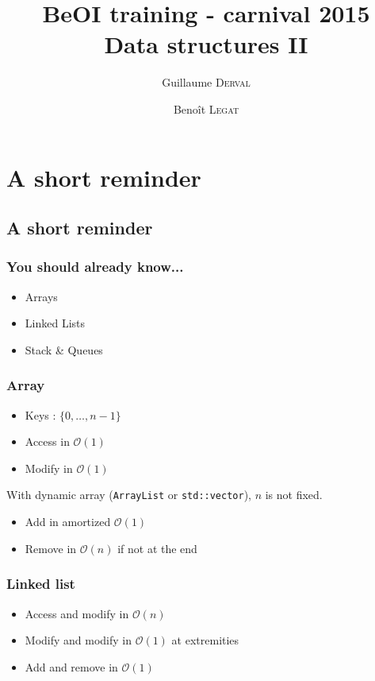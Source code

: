 \documentclass[10pt,svgnames,usenames,table]{beamer} %
\institute{Belgian Olympiad in Informatics}
\title{\textbf{BeOI training - carnival 2015}\\Data structures II}
\author{Guillaume \textsc{Derval} \and Benoît \textsc{Legat}}
\newcommand{\bigoh}{\mathcal{O}}
\begin{document}
\begin{frame}
\maketitle
\end{frame}


\section{A short reminder}
\subsection*{A short reminder}
\begin{frame}
  \frametitle{You should already know...}
  \begin{itemize}
    \item Arrays
    \item Linked Lists
    \item Stack \& Queues
  \end{itemize}
\end{frame}

\begin{frame}
  \frametitle{Array}
  \begin{itemize}
    \item Keys : $\{0, \ldots, n-1\}$
    \item Access in $\bigoh(1)$
    \item Modify in $\bigoh(1)$
  \end{itemize}
  With dynamic array (\lstinline|ArrayList| or \lstinline|std::vector|), $n$ is not fixed.
  \begin{itemize}
    \item Add in amortized $\bigoh(1)$
    \item Remove in $\bigoh(n)$ if not at the end
  \end{itemize}
\end{frame}

\begin{frame}
  \frametitle{Linked list}
  \begin{itemize}
    \item Access  and modify in $\bigoh(n)$
    \item Modify and modify in $\bigoh(1)$ at extremities
    \item Add and remove in $\bigoh(1)$
  \end{itemize}
\end{frame}
\end{document}
